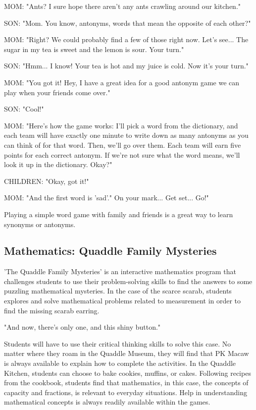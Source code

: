 MOM: "Ants? I sure hope there aren't any ants crawling around our kitchen."

SON: "Mom.
You know, antonyms, words that mean the opposite of each other?"

MOM: "Right? We could probably find a few of those right now.
Let's see...
The sugar in my tea is sweet and the lemon is sour.
Your turn."

SON: "Hmm...
I know!
Your tea is hot and my juice is cold.
Now it's your turn."

MOM: "You got it!
Hey, I have a great idea for a good antonym game we can play when your friends come over."

SON: "Cool!"

MOM: "Here's how the game works: I'll pick a word from the dictionary, and each team will have exactly one minute to write down as many antonyms as you can think of for that word.
Then, we'll go over them.
Each team will earn five points for each correct antonym.
If we're not sure what the word means, we'll look it up in the dictionary.
Okay?"

CHILDREN: "Okay, got it!"

MOM: "And the first word is 'sad'."
On your mark... Get set... Go!"

Playing a simple word game with family and friends is a great way to learn synonyms or antonyms.

\subsection{Mathematics: Quaddle Family Mysteries}

'The Quaddle Family Mysteries' is an interactive mathematics program that challenges students to use their problem-solving skills to find the answers to some puzzling mathematical mysteries.
In the case of the scarce scarab, students explores and solve mathematical problems related to measurement in order to find the missing scarab earring.

"And now, there's only one, and this shiny button."

Students will have to use their critical thinking skills to solve this case.
No matter where they roam in the Quaddle Museum, they will find that PK Macaw is always available to explain how to complete the activities.
In the Quaddle Kitchen, students can choose to bake cookies, muffins, or cakes.
Following recipes from the cookbook, students find that mathematics, in this case, the concepts of capacity and fractions, is relevant to everyday situations.
Help in understanding mathematical concepts is always readily available within the games.

